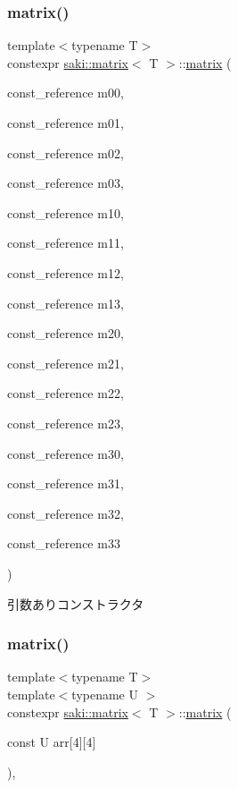 \subsubsection{\texorpdfstring{matrix()}{matrix()}\hspace{0.1cm}{\footnotesize\ttfamily [2/6]}}
{\footnotesize\ttfamily template$<$typename T$>$ \\
constexpr \mbox{\hyperlink{classsaki_1_1matrix}{saki\+::matrix}}$<$ T $>$\+::\mbox{\hyperlink{classsaki_1_1matrix}{matrix}} (\begin{DoxyParamCaption}\item[{const\+\_\+reference}]{m00,  }\item[{const\+\_\+reference}]{m01,  }\item[{const\+\_\+reference}]{m02,  }\item[{const\+\_\+reference}]{m03,  }\item[{const\+\_\+reference}]{m10,  }\item[{const\+\_\+reference}]{m11,  }\item[{const\+\_\+reference}]{m12,  }\item[{const\+\_\+reference}]{m13,  }\item[{const\+\_\+reference}]{m20,  }\item[{const\+\_\+reference}]{m21,  }\item[{const\+\_\+reference}]{m22,  }\item[{const\+\_\+reference}]{m23,  }\item[{const\+\_\+reference}]{m30,  }\item[{const\+\_\+reference}]{m31,  }\item[{const\+\_\+reference}]{m32,  }\item[{const\+\_\+reference}]{m33 }\end{DoxyParamCaption})\hspace{0.3cm}{\ttfamily [inline]}}



引数ありコンストラクタ 

\mbox{\label{classsaki_1_1matrix_aadbe6027fea1fecafc641cd553855408}} 
\subsubsection{\texorpdfstring{matrix()}{matrix()}\hspace{0.1cm}{\footnotesize\ttfamily [3/6]}}
{\footnotesize\ttfamily template$<$typename T$>$ \\
template$<$typename U $>$ \\
constexpr \mbox{\hyperlink{classsaki_1_1matrix}{saki\+::matrix}}$<$ T $>$\+::\mbox{\hyperlink{classsaki_1_1matrix}{matrix}} (\begin{DoxyParamCaption}\item[{const U}]{arr\mbox{[}4\mbox{]}\mbox{[}4\mbox{]} }\end{DoxyParamCaption})\hspace{0.3cm}{\ttfamily [inline]}, {\ttfamily [explicit]}}




